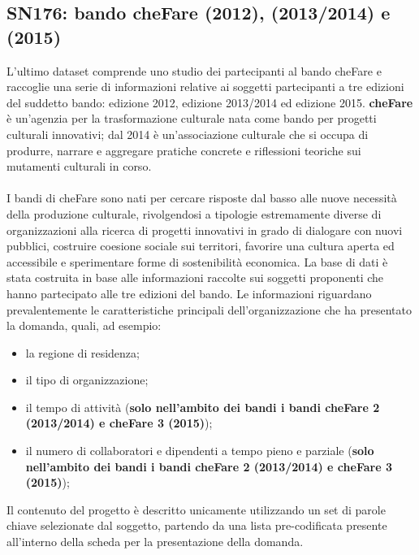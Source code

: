 \documentclass[a4paper,10pt]{scrartcl}
\begin{document}
\subsection{SN176: bando cheFare (2012), (2013/2014) e (2015)}
L'ultimo dataset comprende uno studio dei partecipanti al bando cheFare e raccoglie una serie di informazioni relative ai soggetti partecipanti a tre edizioni del suddetto bando: edizione 2012, edizione 2013/2014 ed edizione 2015. \textbf{cheFare} è un'agenzia per la trasformazione culturale nata come bando per progetti culturali innovativi; dal 2014 è un’associazione culturale che si occupa di produrre, narrare e aggregare pratiche concrete e riflessioni teoriche sui mutamenti culturali in corso. 
\\ \\
I bandi di cheFare sono nati per cercare risposte dal basso alle nuove necessità della produzione culturale, rivolgendosi a tipologie estremamente diverse di organizzazioni alla ricerca di progetti innovativi in grado di dialogare con nuovi pubblici, costruire coesione sociale sui territori, favorire una cultura aperta ed accessibile e sperimentare forme di sostenibilità economica. La base di dati è stata costruita in base alle informazioni raccolte sui soggetti proponenti che hanno partecipato alle tre edizioni del bando. Le informazioni riguardano prevalentemente le caratteristiche principali dell'organizzazione che ha presentato la domanda, quali, ad esempio:
\begin{itemize}
\item la regione di residenza;
\item il tipo di organizzazione;
\item il tempo di attività (\textbf{solo nell'ambito dei bandi i bandi cheFare 2 (2013/2014) e cheFare 3 (2015)});
\item il numero di collaboratori e dipendenti a tempo pieno e parziale (\textbf{solo nell'ambito dei bandi i bandi cheFare 2 (2013/2014) e cheFare 3 (2015)}); 
\end{itemize} 
Il contenuto del progetto è descritto unicamente utilizzando un set di parole chiave selezionate dal soggetto, partendo da una lista pre-codificata presente all’interno della scheda per la presentazione della domanda.
\end{document}

